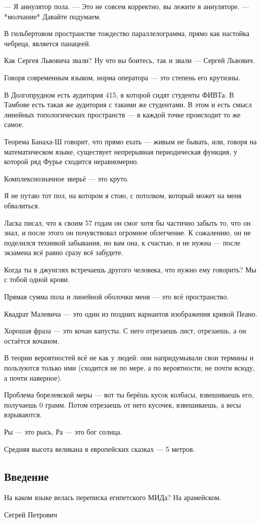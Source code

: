 --- Я аннулятор пола.
--- Это не совсем корректно, вы лежите в аннуляторе.
--- *молчание* Давайте подумаем.

В гильбертовом пространстве тождество параллелограмма, прямо как настойка чебреца, является панацеей.

Как Сергея Львовича звали? Ну что вы боитесь, так и звали --- Сергей Львович.

Говоря современным языком, норма оператора --- это степень его крутизны.

В Долгопрудном есть аудитория 415, в которой сидят студенты ФИВТа. В Тамбове есть такая же аудитория с такими же студентами.
В этом и есть смысл линейных топологических пространств --- в каждой точке происходит то же самое.

Теорема Банаха-Ш говорит, что прямо ехать --- живым не бывать, или, говоря на математическом языке, существует непрерывная периодическая функция, у которой ряд Фурье сходится неравномерно.

Комплекснозначное зверьё --- это круто.

Я не путаю тот пол, на котором я стою, с потолком, который может на меня обвалиться.

Ласка писал, что к своим 57 годам он смог хотя бы частично забыть то, что он знал, и после этого он почувствовал огромное облегчение.
К сожалению, он не поделился техникой забывания, но вам она, к счастью, и не нужна --- после экзамена всё равно сразу всё забудете.

Когда ты в джунглях встречаешь другого человека, что нужно ему говорить?
Мы с тобой одной крови.

Прямая сумма пола и линейной оболочки меня --- это всё пространство.

Квадрат Малевича --- это один из поздних вариантов изображения кривой Пеано.

Хорошая фраза --- это кочан капусты.
С него отрезаешь лист, отрезаешь, а он остаётся кочаном.

В теории вероятностей всё не как у людей: они напридумывали свои термины и пользуются только ими (сходится не по мере, а по вероятности; не почти всюду, а почти наверное).

Проблема борелевской меры --- вот ты берёшь кусок колбасы, взвешиваешь его, получаешь 0 грамм.
Потом отрезаешь от него кусочек, взвешиваешь, а весы взрываются.

Ры --- это рысь, Ра --- это бог солнца.

Средняя высота великана в европейских сказках --- 5 метров.
\fi
\subsection{Введение}
\epigraph{На каком языке велась переписка египетского МИДа? На арамейском.}{Сегрей Петрович}

